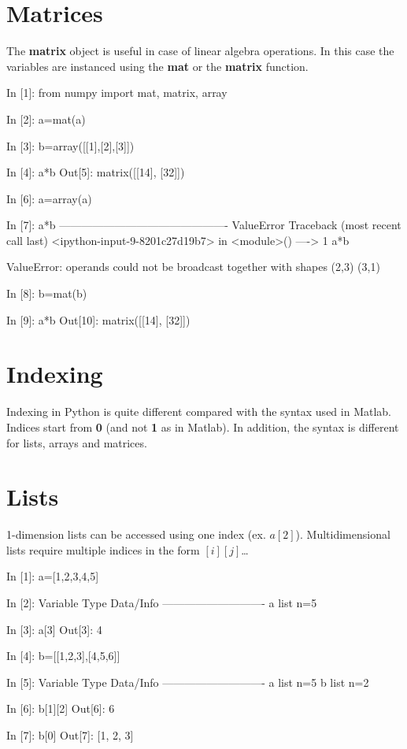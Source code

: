\section{Matrices}
The \textbf{matrix} object is useful in case of linear algebra operations.
In this case the variables are instanced using the \textbf{mat} or the
\textbf{matrix} function.

\begin{code}
In [1]: from numpy import mat, matrix, array

In [2]: a=mat(a)

In [3]: b=array([[1],[2],[3]])

In [4]: a*b
Out[5]: 
matrix([[14],
        [32]])

In [6]: a=array(a)
\end{code}

\begin{code}
In [7]: a*b
----------------------------------------------
ValueError			Traceback (most recent call last)
<ipython-input-9-8201c27d19b7> in <module>()
----> 1 a*b

ValueError: operands could not be broadcast together with shapes (2,3) (3,1) 

In [8]: b=mat(b)

In [9]: a*b
Out[10]: 
matrix([[14],
        [32]])
\end{code}

\section{Indexing}
Indexing in Python is quite different compared with the syntax used in Matlab.
Indices start from \textbf{0} (and not \textbf{1} as in Matlab).
In addition, the syntax is different for lists, arrays and matrices.

\section{Lists}
1-dimension lists can be accessed using one index (ex. $a[2]$). Multidimensional
lists require multiple indices in the form $[i][j]$\ldots

\begin{code}
In [1]: a=[1,2,3,4,5]

In [2]: %
Variable   Type    Data/Info
----------------------------
a          list    n=5

In [3]: a[3]
Out[3]: 4

In [4]: b=[[1,2,3],[4,5,6]]

In [5]: %
Variable   Type    Data/Info
----------------------------
a          list    n=5
b          list    n=2

In [6]: b[1][2]
Out[6]: 6

In [7]: b[0]
Out[7]: [1, 2, 3]
\end{code}

